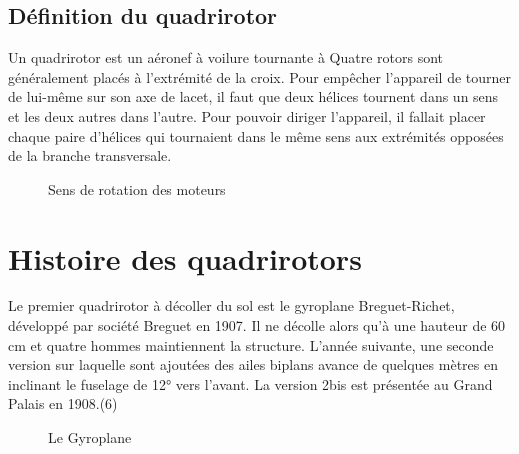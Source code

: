 \documentclass[a4paper,12pt]{report}
\begin{document}
	\subsection{Définition du quadrirotor}
	Un quadrirotor est un aéronef à voilure tournante à Quatre rotors sont généralement placés à l'extrémité de la croix. Pour empêcher l'appareil de tourner de lui-même sur son axe de lacet, il faut que deux hélices tournent dans un sens et les deux autres dans l'autre. Pour pouvoir diriger l'appareil, il fallait placer chaque paire d'hélices qui tournaient dans le même sens aux extrémités opposées de la branche transversale.
	\begin{figure}[h] 
	\begin{center} 
		\centering
		
	\end{center}
	\caption{Sens de rotation des moteurs }
	\end{figure}
	\section{Histoire des quadrirotors}
	Le premier quadrirotor à décoller du sol est le gyroplane Breguet-Richet, développé par société Breguet en 1907. Il ne décolle alors qu'à une hauteur de 60 cm et quatre hommes maintiennent la structure. L'année suivante, une seconde version sur laquelle sont ajoutées des ailes biplans avance de quelques mètres en inclinant le fuselage de 12° vers l'avant. La version 2bis est présentée au Grand Palais en 1908.(6)
	\begin{figure}[h] 
	\begin{center} 
		\centering
		
	\end{center}
	\caption{Le Gyroplane }
	\end{figure}
\end{document}
